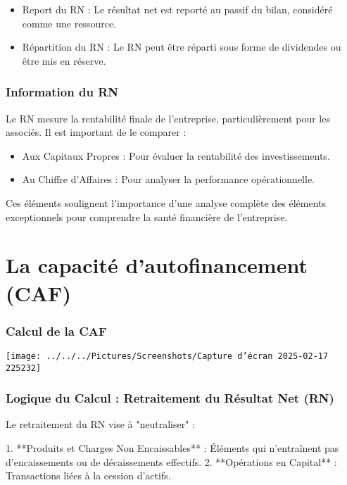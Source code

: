 \documentclass[a4paper, 12pt]{report}
\begin{document}
\begin{itemize}
	\item Report du RN : Le résultat net est reporté au passif du bilan, considéré comme une ressource.
	\item Répartition du RN : Le RN peut être réparti sous forme de dividendes ou être mis en réserve.
\end{itemize}

\subsubsection{Information du RN}

Le RN mesure la rentabilité finale de l'entreprise, particulièrement pour les associés. Il est important de le comparer :

\begin{itemize}
	\item Aux Capitaux Propres : Pour évaluer la rentabilité des investissements.
	\item Au Chiffre d'Affaires : Pour analyser la performance opérationnelle.
\end{itemize}

Ces éléments soulignent l'importance d'une analyse complète des éléments exceptionnels pour comprendre la santé financière de l'entreprise.

\section{La capacité d'autofinancement (CAF)}

\subsubsection{Calcul de la CAF}

\begin{center}
	\texttt{[image: ../../../Pictures/Screenshots/Capture d'écran 2025-02-17 225232]}
\end{center}

\subsubsection{Logique du Calcul : Retraitement du Résultat Net (RN)}

Le retraitement du RN vise à "neutraliser" :

1. **Produits et Charges Non Encaissables** : Éléments qui n'entraînent pas d'encaissements ou de décaissements effectifs.
2. **Opérations en Capital** : Transactions liées à la cession d'actifs.
\end{document}
